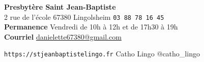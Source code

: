 \begin{framed}
\textbf{Presbytère Saint Jean-Baptiste} \\
	2 rue de l'école 67380 Lingolsheim \texttt{03 88 78 16 45} \\
\textbf{Permanence} Vendredi de 10h à 12h et de 17h30 à 19h\\
\textbf{Courriel} \href{mailto:danielette67380@gmail.com}{danielette67380@gmail.com}


\texttt{https://stjeanbaptistelingo.fr} \hfill \faFacebook Catho Lingo \hfill \faInstagram @catho\_lingo
\end{framed}

